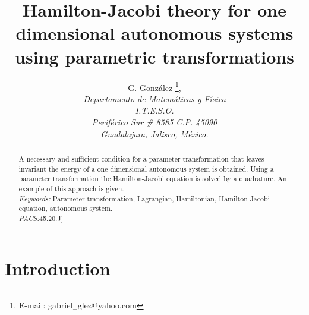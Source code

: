 
\setlength{\textwidth}{150mm} \setlength{\textheight}{200mm}
\setlength{\topmargin}{5mm} \setlength{\oddsidemargin}{5mm}
\setlength{\evensidemargin}{5mm} \setlength{\parskip}{1mm}
\setlength{\parindent}{10mm} \setlength{\baselineskip}{50mm}
\def\refname{References}
\linespread{1.6}


\title{ Hamilton-Jacobi theory for one dimensional autonomous systems using
parametric transformations }
\author{ G. Gonz\'alez \thanks{%
E-mail: gabriel${}_{-}$glez@yahoo.com}, \\
{\it Departamento de Matem\'aticas y F{\'\i}sica} \\
{\it I.T.E.S.O.}\\
{\it Perif\'erico Sur \# 8585 C.P. 45090} \\
{\it Guadalajara, Jalisco, M\'exico.}}
\date{}
\maketitle

\begin{abstract}
A necessary and sufficient condition for a parameter
transformation that leaves invariant the energy of a one
dimensional autonomous system is obtained. Using a parameter
transformation the Hamilton-Jacobi equation is solved by a
quadrature. An example of this approach is given.\\
{\em Keywords:} Parameter transformation, Lagrangian, Hamiltonian,
Hamilton-Jacobi equation, autonomous system.\\
{\em PACS:}45.20.Jj
\end{abstract}

\newpage

\section{Introduction}

